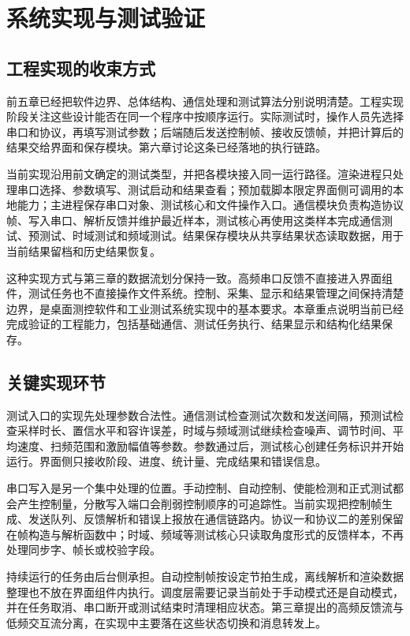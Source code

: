 \chapter{系统实现与测试验证}

\section{工程实现的收束方式}

前五章已经把软件边界、总体结构、通信处理和测试算法分别说明清楚。工程实现阶段关注这些设计能否在同一个程序中按顺序运行。实际测试时，操作人员先选择串口和协议，再填写测试参数；后端随后发送控制帧、接收反馈帧，并把计算后的结果交给界面和保存模块。第六章讨论这条已经落地的执行链路。

当前实现沿用前文确定的测试类型，并把各模块接入同一运行路径。渲染进程只处理串口选择、参数填写、测试启动和结果查看；预加载脚本限定界面侧可调用的本地能力；主进程保存串口对象、测试核心和文件操作入口。通信模块负责构造协议帧、写入串口、解析反馈并维护最近样本，测试核心再使用这类样本完成通信测试、预测试、时域测试和频域测试。结果保存模块从共享结果状态读取数据，用于当前结果留档和历史结果恢复。

这种实现方式与第三章的数据流划分保持一致。高频串口反馈不直接进入界面组件，测试任务也不直接操作文件系统。控制、采集、显示和结果管理之间保持清楚边界，是桌面测控软件和工业测试系统实现中的基本要求\cite{zhang2017qtflowmeter,liu2022industrialsoftware}。本章重点说明当前已经完成验证的工程能力，包括基础通信、测试任务执行、结果显示和结构化结果保存。

\section{关键实现环节}

测试入口的实现先处理参数合法性。通信测试检查测试次数和发送间隔，预测试检查采样时长、置信水平和容许误差，时域与频域测试继续检查噪声、调节时间、平均速度、扫频范围和激励幅值等参数。参数通过后，测试核心创建任务标识并开始运行。界面侧只接收阶段、进度、统计量、完成结果和错误信息。

串口写入是另一个集中处理的位置。手动控制、自动控制、使能检测和正式测试都会产生控制量，分散写入端口会削弱控制顺序的可追踪性。当前实现把控制帧生成、发送队列、反馈解析和错误上报放在通信链路内。协议一和协议二的差别保留在帧构造与解析函数中；时域、频域等测试核心只读取角度形式的反馈样本，不再处理同步字、帧长或校验字段。

持续运行的任务由后台侧承担。自动控制帧按设定节拍生成，离线解析和渲染数据整理也不放在界面组件内执行。调度层需要记录当前处于手动模式还是自动模式，并在任务取消、串口断开或测试结束时清理相应状态。第三章提出的高频反馈流与低频交互流分离，在实现中主要落在这些状态切换和消息转发上。

